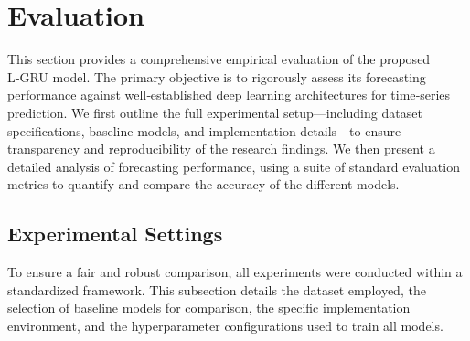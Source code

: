\documentclass{cys}
\begin{document}
\section{Evaluation}\label{sec:evaluation}
This section provides a comprehensive empirical evaluation of the proposed L‑GRU model. The primary objective is to rigorously assess its forecasting performance against well‑established deep learning architectures for time‑series prediction. We first outline the full experimental setup—including dataset specifications, baseline models, and implementation details—to ensure transparency and reproducibility of the research findings. We then present a detailed analysis of forecasting performance, using a suite of standard evaluation metrics to quantify and compare the accuracy of the different models.
\subsection{Experimental Settings}
To ensure a fair and robust comparison, all experiments were conducted within a standardized framework. This subsection details the dataset employed, the selection of baseline models for comparison, the specific implementation environment, and the hyperparameter configurations used to train all models.
\end{document}
